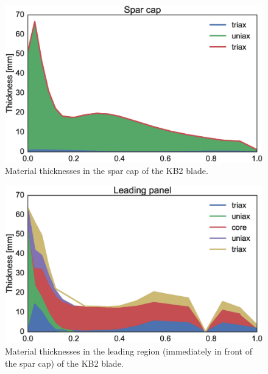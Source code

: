 \begin{figure}[pth]
\begin{center}
	\includegraphics[width=.85\linewidth]{figures/KB2_region04.eps}
\end{center}
\caption{Material thicknesses in the spar cap of the KB2 blade.}
\label{fig:KB2matstackr04}
\end{figure}

\begin{figure}[pth]
\begin{center}
	\includegraphics[width=.85\linewidth]{figures/KB2_region06.eps}
\end{center}
\caption{Material thicknesses in the leading region (immediately in front of the spar cap) of the KB2 blade.}
\label{fig:KB2matstackr06}
\end{figure}

